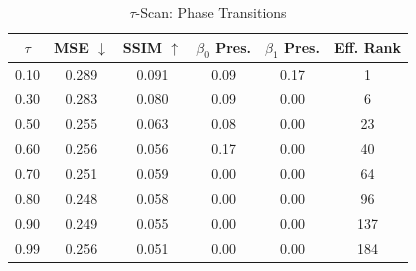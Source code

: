 \begin{table}[t]
\caption{$\tau$-Scan: Phase Transitions}
\label{tab:tau_scan}
\begin{tabular}{cccccc}
\toprule
$\tau$ & MSE $\downarrow$ & SSIM $\uparrow$ & $\beta_0$ Pres. & $\beta_1$ Pres. & Eff. Rank \\
\midrule
0.10 & 0.289 & 0.091 & 0.09 & 0.17 & 1 \\
0.30 & 0.283 & 0.080 & 0.09 & 0.00 & 6 \\
0.50 & 0.255 & 0.063 & 0.08 & 0.00 & 23 \\
0.60 & 0.256 & 0.056 & 0.17 & 0.00 & 40 \\
0.70 & 0.251 & 0.059 & 0.00 & 0.00 & 64 \\
0.80 & 0.248 & 0.058 & 0.00 & 0.00 & 96 \\
0.90 & 0.249 & 0.055 & 0.00 & 0.00 & 137 \\
0.99 & 0.256 & 0.051 & 0.00 & 0.00 & 184 \\
\bottomrule
\end{tabular}
\end{table}